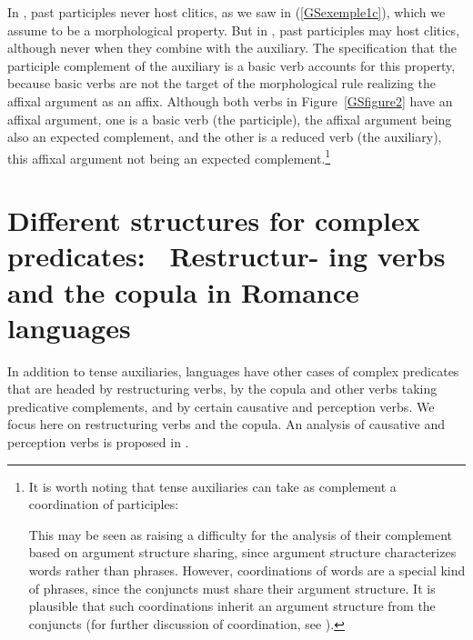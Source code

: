 In , past participles never host clitics, as we saw in (\ref{GSexemple1c}), which we assume to be a morphological property. But in , past participles may host clitics, although never when they combine
with the auxiliary. The specification that the participle complement of the auxiliary is a basic verb accounts for this property, because basic verbs are not the target of the morphological rule realizing the affixal argument as an affix. Although both verbs in Figure~\ref{GSfigure2} have an affixal argument, one is a basic verb (the participle), the affixal argument being also an expected complement, and the other is a reduced verb (the auxiliary), this affixal argument not being an expected complement.\footnote{It is worth noting that tense auxiliaries can take as complement a coordination of participles:
	
\eal
	\label{FootExample1}
	\label{FootExample1a}
		
	\label{FootExample1b}
\zl
This may be seen as raising a difficulty for the analysis of their complement based on argument structure sharing, since argument structure characterizes words rather than phrases. However, coordinations of words are a special kind of phrases, since the conjuncts must share their argument structure. It is plausible that such coordinations inherit an argument structure from the conjuncts (for further discussion of coordination, see ).}

\section{Different structures for complex predicates:~ Restructur- ing verbs and the copula in Romance
  languages}\label{GSsection3}
\label{sec-copula-romance}

In addition to tense auxiliaries,  languages have other cases of complex predicates that are headed by restructuring verbs, by the copula and other verbs taking predicative complements, and by certain causative and perception verbs. We focus here on restructuring
verbs and the copula. An analysis of causative and perception verbs is proposed in \citet{abeille1995doublestructure, AGMS98a, AG2010}. 

